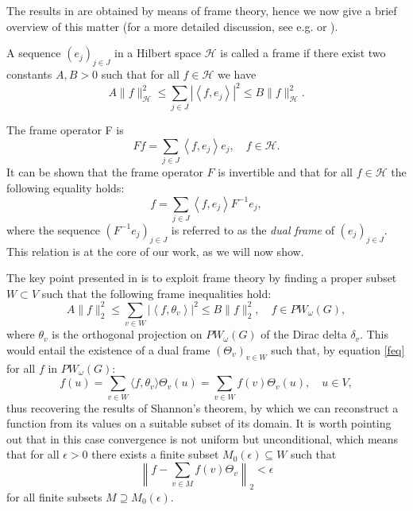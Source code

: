 \documentclass[12pt]{amsart}
\theoremstyle{definition}
\numberwithin{equation}{section}
\theoremstyle{definition}
\theoremstyle{remark}
\numberwithin{equation}{section}
\begin{document}
The results in \cite{PW1} are obtained by means of frame theory, hence we now give a brief overview of this matter (for a more detailed discussion, see e.g. \cite{KG} or \cite{DS}).

A sequence $(e_j )_{j \in J}$ in a Hilbert space $\mathcal{H}$ is called a frame if there exist two constants $A,B>0$ such that for all $f \in \mathcal{H}$ we have
$$
A\|f\|^2_{\mathcal{H}}\leq\sum_{j\in J}|\left<f, e_j\right>|^2\leq B\|f\|^2_{\mathcal{H}}.
$$

The frame operator F is 
$$
Ff = \sum_{j\in J}\left<f, e_j\right>e_j, \quad f\in \mathcal{H}.
$$
It can be shown that the frame operator $F$ is invertible and that for all $f \in \mathcal{H}$ the following equality holds:
\begin{equation}
\label{feq}
   f = \sum_{j \in J}\left<f, e_j\right>F^{-1}e_j, 
\end{equation}
where the sequence $(F^{-1}e_j)_{j \in J}$ is referred to as the \textit{dual frame} of $(e_j)_{j \in J}$. This relation is at the core of our work, as we will now show.

The key point presented in \cite{PW1} is to exploit frame theory by finding a proper subset $W \subset V$ such that the following frame inequalities hold:
\begin{equation}
A\|f\|_2^2 \leq \sum_{v \in W}\left|\left\langle f, \theta_v\right\rangle\right|^2 \leq B\|f\|_2^2, \quad f\in PW_\omega(G),  
\end{equation}
where $\theta_v$ is the orthogonal projection on $PW_\omega(G)$ of the Dirac delta $\delta_v$. This would entail the existence of a dual frame $(\Theta_v)_{v\in W}$ such that, by equation \eqref{feq} for all $f$ in $PW_\omega(G)$:
$$
f(u) = \sum_{v \in W}\langle f,\theta_v\rangle\Theta_v(u) = \sum_{v \in W}f(v)\Theta_v(u),  \quad u \in V,
$$
thus recovering the results of Shannon's theorem, by which we can reconstruct a function from its values on a suitable subset of its domain. It is worth pointing out that in this case convergence is not uniform but unconditional, which means that for all $\epsilon >0$ there exists a finite subset $M_0(\epsilon) \subseteq W$ such that
$$
\left\|f - \sum_{v \in M}f(v)\Theta_v\right\|_2 < \epsilon
$$
for all finite subsets $M \supseteq M_0(\epsilon)$.
\end{document}
